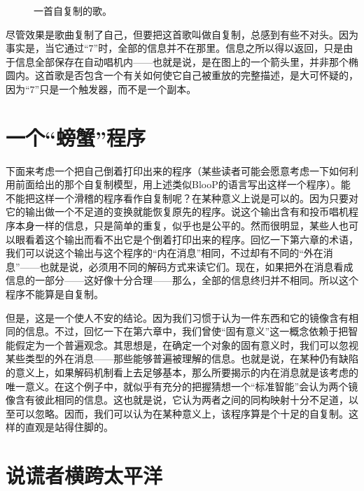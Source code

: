 \begin{figure}
\caption{一首自复制的歌。}
\end{figure}

尽管效果是歌曲复制了自己，但要把这首歌叫做自复制，总感到有些不对头。因为事实是，当它通过“$7$”时，全部的信息并不在那里。信息之所以得以返回，只是由于信息全部保存在自动唱机内——也就是说，是在图上的一个箭头里，并非那个椭圆内。这首歌是否包含一个有关如何使它自己被重放的完整描述，是大可怀疑的，因为“$7$”只是一个触发器，而不是一个副本。

\section{一个“螃蟹”程序}

下面来考虑一个把自己倒着打印出来的程序（某些读者可能会愿意考虑一下如何利用前面给出的那个自复制模型，用上述类似BlooP的语言写出这样一个程序）。能不能把这样一个滑稽的程序看作自复制呢？在某种意义上说是可以的。因为只要对它的输出做一个不足道的变换就能恢复原先的程序。说这个输出含有和投币唱机程序本身一样的信息，只是简单的重复，似乎也是公平的。然而很明显，某些人也可以眼看着这个输出而看不出它是个倒着打印出来的程序。回忆一下第六章的术语，我们可以说这个输出与这个程序的“内在消息”相同，不过却有不同的“外在消息”——也就是说，必须用不同的解码方式来读它们。现在，如果把外在消息看成信息的一部分——这好像十分合理——那么，全部的信息终归并不相同。所以这个程序不能算是自复制。

但是，这是一个使人不安的结论。因为我们习惯于认为一件东西和它的镜像含有相同的信息。不过，回忆一下在第六章中，我们曾使“固有意义”这一概念依赖于把智能假定为一个普遍观念。其思想是，在确定一个对象的固有意义时，我们可以忽视某些类型的外在消息——那些能够普遍被理解的信息。也就是说，在某种仍有缺陷的意义上，如果解码机制看上去足够基本，那么所要揭示的内在消息就是该考虑的唯一意义。在这个例子中，就似乎有充分的把握猜想一个“标准智能”会认为两个镜像含有彼此相同的信息。这也就是说，它认为两者之间的同构映射十分不足道，以至可以忽略。因而，我们可以认为在某种意义上，该程序算是个十足的自复制。这样的直观是站得住脚的。

\section{说谎者横跨太平洋}

